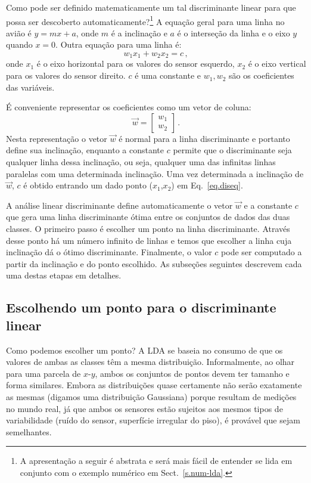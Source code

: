 Como pode ser definido matematicamente um tal discriminante linear para que possa ser descoberto automaticamente?\footnote{A apresentação a seguir é abstrata e será mais fácil de entender se lida em conjunto com o exemplo numérico em Sect.~\ref{s.num-lda}.} A equação geral para uma linha no avião é $y=mx+a$, onde $m$ é a inclinação e $a$ é o interseção da linha e o eixo $y$ quando $x=0$. Outra equação para uma linha é:
\begin{equation}
w_1x_1 + w_2x_2 = c\,,\label{eq.diseq}
\end{equation}
onde $x_1$ é o eixo horizontal para os valores do sensor esquerdo, $x_2$ é o eixo vertical para os valores do sensor direito. $c$ é uma constante e $w_1,w_2$ são os coeficientes das variáveis.

É conveniente representar os coeficientes como um vetor de coluna:
\[
\vec{w} = \left[ \begin{array}{c} w_1\\w_2 \end{array} \right]\,.
\]
Nesta representação o vetor $\vec{w}$ é normal para a linha discriminante e portanto define sua inclinação, enquanto a constante $c$ permite que o discriminante seja qualquer linha dessa inclinação, ou seja, qualquer uma das infinitas linhas paralelas com uma determinada inclinação. Uma vez determinada a inclinação de $\vec{w}$, $c$ é obtido entrando um dado ponto ($x_1$,$x_2$) em Eq.~\ref{eq.diseq}.

A análise linear discriminante define automaticamente o vetor $\vec{w}$ e a constante $c$ que gera uma linha discriminante ótima entre os conjuntos de dados das duas classes. O primeiro passo é escolher um ponto na linha discriminante. Através desse ponto há um número infinito de linhas e temos que escolher a linha cuja inclinação dá o ótimo discriminante. Finalmente, o valor $c$ pode ser computado a partir da inclinação e do ponto escolhido. As subseções seguintes descrevem cada uma destas etapas em detalhes.

\subsection{Escolhendo um ponto para o discriminante linear}

Como podemos escolher um ponto? A LDA se baseia no {consumo} de que os valores de ambas as classes têm a mesma distribuição. Informalmente, ao olhar para uma parcela de $x$-$y$, ambos os conjuntos de pontos devem ter tamanho e forma similares. Embora as distribuições quase certamente não serão exatamente as mesmas (digamos uma distribuição Gaussiana) porque resultam de medições no mundo real, já que ambos os sensores estão sujeitos aos mesmos tipos de variabilidade (ruído do sensor, superfície irregular do piso), é provável que sejam semelhantes.

